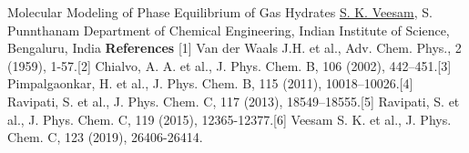 \begin{abstract_online}{Molecular Modeling of Phase Equilibrium of Gas Hydrates}{%
        \underline{S. K. Veesam}, S. Punnthanam}{%
        }{%
        Department of Chemical Engineering, Indian Institute of Science, Bengaluru, India}
        \textbf{References} \newline{}[1] Van der Waals J.H. et al., Adv. Chem. Phys., 2 (1959), 1-57.\newline{}[2] Chialvo, A. A. et al., J. Phys. Chem. B, 106 (2002), 442–451.\newline{}[3] Pimpalgaonkar, H. et al., J. Phys. Chem. B, 115 (2011), 10018–10026.\newline{}[4] Ravipati, S. et al., J. Phys. Chem. C, 117 (2013), 18549–18555.\newline{}[5] Ravipati, S. et al., J. Phys. Chem. C, 119 (2015), 12365-12377.\newline{}[6] Veesam S. K. et al., J. Phys. Chem. C, 123 (2019), 26406-26414.
    \end{abstract_online}
    